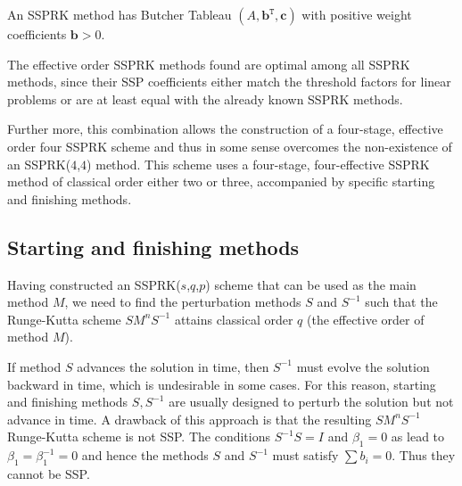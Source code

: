 \begin{lemma}\label{lem:ssp_pos_coef}\cite{Ruuth2002}
  An SSPRK method
  has Butcher Tableau \( (A,\textbf{b}^{\texttt{T}},\textbf{c}) \) with positive weight coefficients \( \textbf{b} > 0 \).
\end{lemma}


The effective order SSPRK methods found are optimal among all SSPRK methods, since their SSP coefficients either match the threshold factors for linear problems  or are at least equal with the already known SSPRK methods. 


Further more, this combination allows the construction of a
four-stage, effective order four SSPRK scheme and thus in some sense overcomes the
non-existence of an SSPRK(\( 4 \),\( 4 \)) method.  This scheme uses a
four-stage, four-effective SSPRK method of classical order either two
or three, accompanied by specific starting and finishing methods.



\subsection{Starting and finishing methods}\label{subsection3.2}
Having constructed an SSPRK(\( s \),\( q \),\( p \)) scheme that can
be used as the main method \( M \), we need to find the perturbation
methods \( S \) and \( S^{-1} \) such that the Runge-Kutta scheme \(
SM^{n}S^{-1} \) attains classical order $q$ (the effective order of
method \( M \)).

If method $S$ advances the solution in time,
then $S^{-1}$ must evolve the solution backward in time, which is undesirable in
some cases.  For this reason,
starting and finishing methods $S,S^{-1}$ are usually designed to perturb
the solution but not advance in time.  
A drawback of this approach is that the resulting \(
SM^{n}S^{-1} \) Runge-Kutta scheme is not SSP. The conditions \( S^{-1}S = I \)
and \( \beta_{1} = 0 \) as lead to \( \beta_{1} = \beta^{-1}_{1} = 0 \) and
hence the methods \( S \) and \( S^{-1} \) must satisfy $\sum b_i = 0$.  Thus
they cannot be SSP.  

